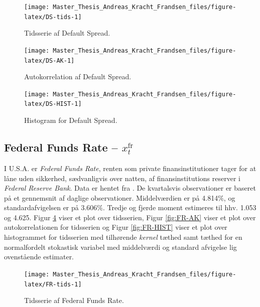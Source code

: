 \documentclass[
  a4paper,
  oneside]{memoir}
\begin{document}
\begin{figure}[H]

{\centering \texttt{[image: Master\_Thesis\_Andreas\_Kracht\_Frandsen\_files/figure-latex/DS-tids-1]} 

}

\caption{Tidsserie af Default Spread.}\label{fig:DS-tids}
\end{figure}

\begin{figure}[H]

{\centering \texttt{[image: Master\_Thesis\_Andreas\_Kracht\_Frandsen\_files/figure-latex/DS-AK-1]} 

}

\caption{Autokorrelation af Default Spread.}\label{fig:DS-AK}
\end{figure}

\begin{figure}[H]

{\centering \texttt{[image: Master\_Thesis\_Andreas\_Kracht\_Frandsen\_files/figure-latex/DS-HIST-1]} 

}

\caption{Histogram for Default Spread.}\label{fig:DS-HIST}
\end{figure}

\hypertarget{federal-funds-rate-x_ttextfr}{%
\subsection{\texorpdfstring{Federal Funds Rate -- \(x_t^{\text{fr}}\)}{Federal Funds Rate -- x\_t\^{}\{\textbackslash text\{fr\}\}}}\label{federal-funds-rate-x_ttextfr}}

I U.S.A. er \emph{Federal Funds Rate}, renten som private finansinstitutioner tager for at låne uden sikkerhed, sædvanligvis over natten, af finansinstitutions reserver i \emph{Federal Reserve Bank}. Data er hentet fra \citep{FREDF2020}. De kvartalsvis observationer er baseret på et gennemsnit af daglige observationer. Middelværdien er på 4.814\(\%\), og standardafvigelsen er på 3.606\(\%\). Tredje og fjerde moment estimeres til hhv. 1.053 og 4.625. Figur \ref{fig:FR-tids} viser et plot over tidsserien, Figur \ref{fig:FR-AK} viser et plot over autokorrelationen for tidsserien og Figur \ref{fig:FR-HIST} viser et plot over histogrammet for tidsserien med tilhørende \emph{kernel} tæthed samt tæthed for en normalfordelt stokastisk variabel med middelværdi og standard afvigelse lig ovenstående estimater.

\begin{figure}[H]

{\centering \texttt{[image: Master\_Thesis\_Andreas\_Kracht\_Frandsen\_files/figure-latex/FR-tids-1]} 

}

\caption{Tidsserie af Federal Funds Rate.}\label{fig:FR-tids}
\end{figure}
\end{document}
